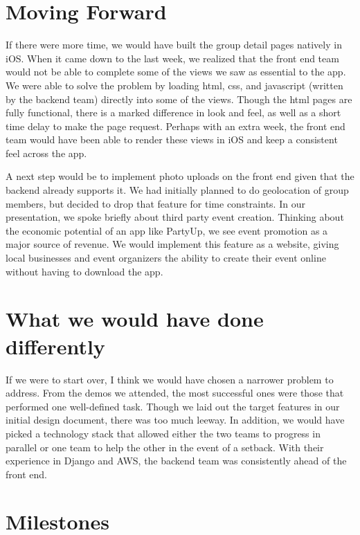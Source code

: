 \documentclass[12pt]{article}
\begin{document}
\bigskip

\section{Moving Forward}

If there were more time, we would have built the group detail pages natively in iOS. When it came down to the last week, we realized that the front end team would not be able to complete some of the views we saw as essential to the app. We were able to solve the problem by loading html, css, and javascript (written by the backend team) directly into some of the views. Though the html pages are fully functional, there is a marked difference in look and feel, as well as a short time delay to make the page request. Perhaps with an extra week, the front end team would have been able to render these views in iOS and keep a consistent feel across the app. 

\bigskip

A next step would be to implement photo uploads on the front end given that the backend already supports it. We had initially planned to do geolocation of group members, but decided to drop that feature for time constraints. In our presentation, we spoke briefly about third party event creation. Thinking about the economic potential of an app like PartyUp, we see event promotion as a major source of revenue. We would implement this feature as a website, giving local businesses and event organizers the ability to create their event online without having to download the app.

\bigskip

\section{What we would have done differently}

If we were to start over, I think we would have chosen a narrower problem to address. From the demos we attended, the most successful ones were those that performed one well-defined task. Though we laid out the target features in our initial design document, there was too much leeway. In addition, we would have picked a technology stack that allowed either the two teams to progress in parallel or one team to help the other in the event of a setback. With their experience in Django and AWS, the backend team was consistently ahead of the front end.

\bigskip

\section{Milestones}
\end{document}
